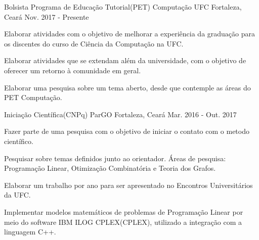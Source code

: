 

\begin{cventries}


  \cventry
    {Bolsista} %
    {Programa de Educação Tutorial(PET) Computação UFC} %
    {Fortaleza, Ceará} %
    {Nov. 2017 - Presente} %
    {
      \begin{cvitems} %
        \item {Elaborar atividades com o objetivo de melhorar a experiência da graduação para os discentes do curso de Ciência da Computação na UFC.}
        \item {Elaborar atividades que se extendam além da universidade, com o objetivo de oferecer um retorno à comunidade em geral.}
        \item {Elaborar uma pesquisa sobre um tema aberto, desde que contemple as áreas do PET Computação.}
      \end{cvitems}
    }
\vskip 0.2cm
  \cventry
    {Iniciação Científica(CNPq)} %
    {ParGO} %
    {Fortaleza, Ceará} %
    {Mar. 2016 - Out. 2017} %
    {
      \begin{cvitems} %
        \item {Fazer parte de uma pesquisa com o objetivo de iniciar o contato com o metodo científico.}
        \item {Pesquisar sobre temas definidos junto ao orientador. Áreas de pesquisa: Programação Linear, Otimização Combinatória e Teoria dos Grafos.}
        \item {Elaborar um trabalho por ano para ser apresentado no Encontros Universitários da UFC.}
        \item {Implementar modelos matemáticos de problemas de Programação Linear por meio do software IBM ILOG CPLEX(CPLEX), utilizado a integração com a linguagem C++.}
      \end{cvitems}
    }
\vskip 0.2cm

\end{cventries}
